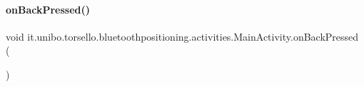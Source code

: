 \hypertarget{classit_1_1unibo_1_1torsello_1_1bluetoothpositioning_1_1activities_1_1MainActivity_ab0010b6d3fe518fabfea843626d7b5f1_ab0010b6d3fe518fabfea843626d7b5f1}{}\label{classit_1_1unibo_1_1torsello_1_1bluetoothpositioning_1_1activities_1_1MainActivity_ab0010b6d3fe518fabfea843626d7b5f1_ab0010b6d3fe518fabfea843626d7b5f1} 
\paragraph{\texorpdfstring{on\+Back\+Pressed()}{onBackPressed()}}
{\footnotesize\ttfamily void it.\+unibo.\+torsello.\+bluetoothpositioning.\+activities.\+Main\+Activity.\+on\+Back\+Pressed (\begin{DoxyParamCaption}{ }\end{DoxyParamCaption})}


